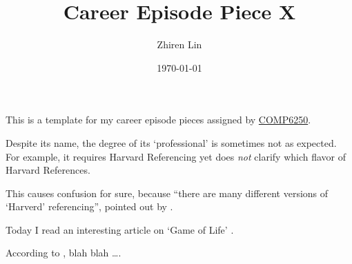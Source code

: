 \documentclass[12pt,a4paper]{article}
\title{Career Episode Piece X}  %
\author{Zhiren Lin}
\date{\today}
\begin{document}
\maketitle
This is a template for my career episode pieces assigned by \href{https://programsandcourses.anu.edu.au/2021/course/comp6250}{COMP6250}.

Despite its name, the degree of its `professional' is sometimes not as expected. For example,
it requires Harvard Referencing yet does \emph{not} clarify which flavor of Harvard References.

This causes confusion for sure, because ``there are many different versions of `Harverd' referencing'', pointed out by \textcite{site:ubathlib}.

Today I read an interesting article on `Game of Life' \parencite{gardner1970}.

According to \textcite{wiki:gol}, blah blah \ldots.

\printbibliography
\end{document}
